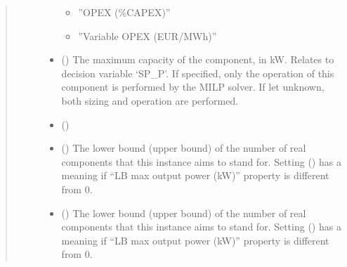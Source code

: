 \documentclass[letterpaper,10pt,english]{sphinxmanual}
\begin{document}
\begin{fulllineitems}
\begin{fulllineitems}
\begin{quote}
\begin{description}
\begin{itemize}
\begin{itemize}
\item {} 
\sphinxAtStartPar
”OPEX (\%CAPEX)”

\item {} 
\sphinxAtStartPar
”Variable OPEX (EUR/MWh)”

\end{itemize}


\item {} 
\sphinxAtStartPar
{} (\sphinxstyleliteralemphasis{\sphinxupquote{, }}) \textendash{} The maximum capacity of the component, in kW.
Relates to decision variable ‘SP\_P’.
If specified, only the operation of this component is performed by the MILP solver.
If let unknown, both sizing and operation are performed.

\item {} 
\sphinxAtStartPar
{} (\sphinxstyleliteralemphasis{\sphinxupquote{, }}) \textendash{} 

\item {} 
\sphinxAtStartPar
{} (\sphinxstyleliteralemphasis{\sphinxupquote{, }}\sphinxstyleliteralemphasis{\sphinxupquote{, }}) \textendash{} The lower bound (upper bound) of the number of real components that this instance aims to stand for.
Setting  () has a meaning if “LB max output power (kW)” property is
different from 0.

\item {} 
\sphinxAtStartPar
{} (\sphinxstyleliteralemphasis{\sphinxupquote{, }}\sphinxstyleliteralemphasis{\sphinxupquote{, }}) \textendash{} The lower bound (upper bound) of the number of real components that this instance aims to stand for.
Setting  () has a meaning if “LB max output power (kW)” property is
different from 0.


\end{itemize}
\end{description}
\end{quote}
\end{fulllineitems}
\end{fulllineitems}
\end{document}
